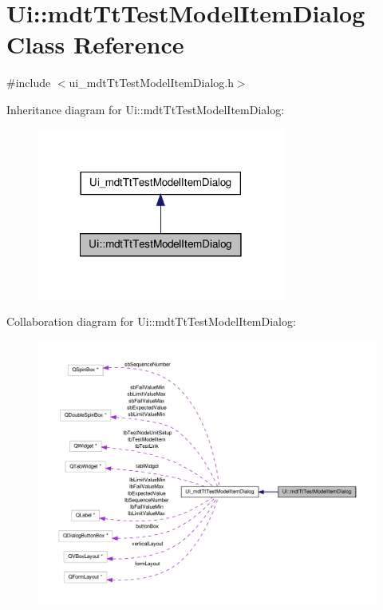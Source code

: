 \hypertarget{class_ui_1_1mdt_tt_test_model_item_dialog}{\section{Ui\-:\-:mdt\-Tt\-Test\-Model\-Item\-Dialog Class Reference}
\label{class_ui_1_1mdt_tt_test_model_item_dialog}
}


{\ttfamily \#include $<$ui\-\_\-mdt\-Tt\-Test\-Model\-Item\-Dialog.\-h$>$}



Inheritance diagram for Ui\-:\-:mdt\-Tt\-Test\-Model\-Item\-Dialog\-:\nopagebreak
\begin{figure}[H]
\begin{center}
\leavevmode
\includegraphics[width=230pt]{class_ui_1_1mdt_tt_test_model_item_dialog__inherit__graph}
\end{center}
\end{figure}


Collaboration diagram for Ui\-:\-:mdt\-Tt\-Test\-Model\-Item\-Dialog\-:\nopagebreak
\begin{figure}[H]
\begin{center}
\leavevmode
\includegraphics[width=350pt]{class_ui_1_1mdt_tt_test_model_item_dialog__coll__graph}
\end{center}
\end{figure}
